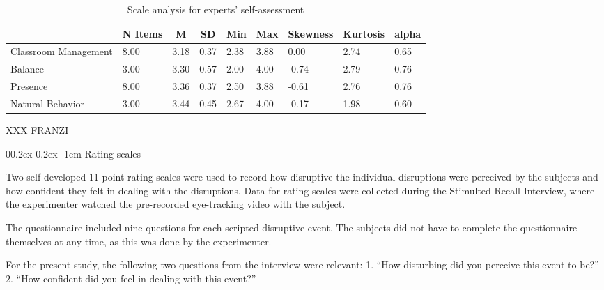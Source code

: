 \documentclass[
  man]{apa6}
\makeatletter
\let\oldparagraph\paragraph
\renewcommand{\paragraph}[1]{\oldparagraph{#1}\mbox{}}
\renewcommand{\paragraph}{\@startsection{paragraph}{4}{\parindent}%
  {0\baselineskip \@plus 0.2ex \@minus 0.2ex}%
  {-1em}%
  {\normalfont\normalsize\bfseries\itshape\typesectitle}}
\makeatother
\begin{document}
\begin{table}[h]

\begin{center}
\begin{threeparttable}

\caption{\label{tab:presence_questionnaire}Scale analysis for experts' self-assessment}

\tiny{

\begin{tabular}{lllllllll}
\toprule
 & \multicolumn{1}{c}{N Items} & \multicolumn{1}{c}{M} & \multicolumn{1}{c}{SD} & \multicolumn{1}{c}{Min} & \multicolumn{1}{c}{Max} & \multicolumn{1}{c}{Skewness} & \multicolumn{1}{c}{Kurtosis} & \multicolumn{1}{c}{alpha}\\
\midrule
Classroom Management & 8.00 & 3.18 & 0.37 & 2.38 & 3.88 & 0.00 & 2.74 & 0.65\\
Balance & 3.00 & 3.30 & 0.57 & 2.00 & 4.00 & -0.74 & 2.79 & 0.76\\
Presence & 8.00 & 3.36 & 0.37 & 2.50 & 3.88 & -0.61 & 2.76 & 0.76\\
Natural Behavior & 3.00 & 3.44 & 0.45 & 2.67 & 4.00 & -0.17 & 1.98 & 0.60\\
\bottomrule
\end{tabular}

}

\end{threeparttable}
\end{center}

\end{table}

XXX FRANZI

\hypertarget{rating-scales}{%
\paragraph{Rating scales}\label{rating-scales}}

Two self-developed 11-point rating scales were used to record how disruptive the individual disruptions were perceived by the subjects and how confident they felt in dealing with the disruptions. Data for rating scales were collected during the Stimulted Recall Interview, where the experimenter watched the pre-recorded eye-tracking video with the subject.

The questionnaire included nine questions for each scripted disruptive event. The subjects did not have to complete the questionnaire themselves at any time, as this was done by the experimenter.

For the present study, the following two questions from the interview were relevant:
1. ``How disturbing did you perceive this event to be?''
2. ``How confident did you feel in dealing with this event?''
\end{document}
